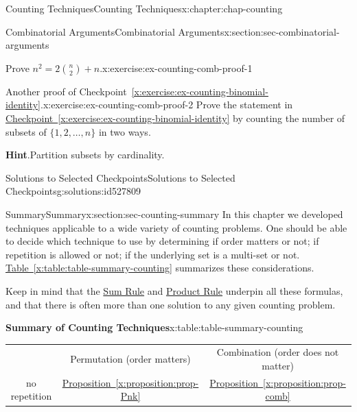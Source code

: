 \documentclass[oneside,10pt,]{book}
\newcommand{\blocktitlefont}{\relax}
\newcommand{\tabularfont}{\relax}
\newcommand{\xreffont}{\relax}
\numberwithin{equation}{section}
\newcommand{\hrulemedium}{\noalign{\hrule height 0.07em}}
\begin{document}
\begin{chapterptx}{Counting Techniques}{}{Counting Techniques}{}{}{x:chapter:chap-counting}
\begin{sectionptx}{Combinatorial Arguments}{}{Combinatorial Arguments}{}{}{x:section:sec-combinatorial-arguments}
\begin{inlineexercise}{Prove \(n^2 = 2\binom{n}{2} + n\).}{x:exercise:ex-counting-comb-proof-1}
\end{inlineexercise}%
\begin{inlineexercise}{Another proof of Checkpoint~{\xreffont\ref*{x:exercise:ex-counting-binomial-identity}}.}{x:exercise:ex-counting-comb-proof-2}%
Prove the statement in \hyperref[x:exercise:ex-counting-binomial-identity]{Checkpoint~{\xreffont\ref{x:exercise:ex-counting-binomial-identity}}} by counting the number of subsets of \(\{1,2,\ldots,n\}\) in two ways.%
\par\smallskip%
\noindent\textbf{\blocktitlefont Hint}.\hypertarget{g:hint:id527813}{}\quad{}Partition subsets by cardinality.%
\end{inlineexercise}%
%
%
\typeout{************************************************}
\typeout{************************************************}
%
\begin{solutions-subsection-numberless}{Solutions to Selected Checkpoints}{}{Solutions to Selected Checkpoints}{}{}{g:solutions:id527809}
\end{solutions-subsection-numberless}
\end{sectionptx}
%
%
\typeout{************************************************}
\typeout{************************************************}
%
\begin{sectionptx}{Summary}{}{Summary}{}{}{x:section:sec-counting-summary}
In this chapter we developed techniques applicable to a wide variety of counting problems. One should be able to decide which technique to use by determining if order matters or not; if repetition is allowed or not; if the underlying set is a multi-set or not. \hyperref[x:table:table-summary-counting]{Table~{\xreffont\ref{x:table:table-summary-counting}}} summarizes these considerations.%
\par
Keep in mind that the \hyperref[x:principle:prin-sum-rule]{Sum Rule} and \hyperref[x:principle:prin-prod-rule]{Product Rule} underpin all these formulas, and that there is often more than one solution to any given counting problem.%
\begin{tableptx}{\textbf{Summary of Counting Techniques}}{x:table:table-summary-counting}{}%
\centering%
{\tabularfont%
\begin{tabular}{ccc}
&Permutation (order matters)&Combination (order does not matter)\tabularnewline\hrulemedium
no repetition&\hyperref[x:proposition:prop-Pnk]{Proposition~{\xreffont\ref{x:proposition:prop-Pnk}}}&\hyperref[x:proposition:prop-comb]{Proposition~{\xreffont\ref{x:proposition:prop-comb}}}\tabularnewline[0pt]

\end{tabular}}
\end{tableptx}
\end{sectionptx}
\end{chapterptx}
\end{document}
